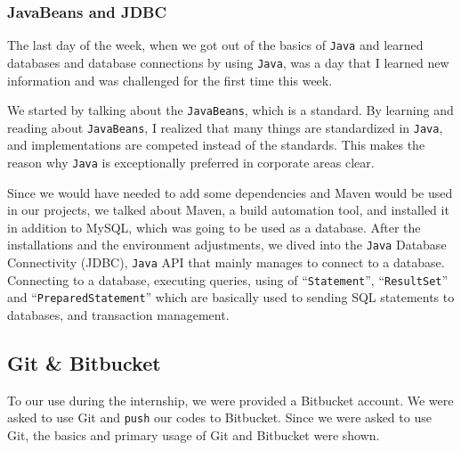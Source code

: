 \subsubsection{JavaBeans and JDBC}

The last day of the week, when we got out of the basics of \texttt{Java} and learned databases and database connections by using \texttt{Java}, was a day that I learned new information and was challenged for the first time this week.

We started by talking about the \texttt{JavaBeans}, which is a standard. By learning and reading about \texttt{JavaBeans}, I realized that many things are standardized in \texttt{Java}, and implementations are competed instead of the standards. This makes the reason why \texttt{Java} is exceptionally preferred in corporate areas clear.

Since we would have needed to add some dependencies and Maven would be used in our projects, we talked about Maven, a build automation tool, and installed it in addition to MySQL, which was going to be used as a database. After the installations and the environment adjustments, we dived into the \texttt{Java} Database Connectivity (JDBC), \texttt{Java} API that mainly manages to connect to a database. Connecting to a database, executing queries, using of ``\texttt{Statement}'', ``\texttt{ResultSet}'' and ``\texttt{PreparedStatement}'' which are basically used to sending SQL statements to databases, and transaction management.


\subsection{Git \& Bitbucket}

To our use during the internship, we were provided a Bitbucket account. We were asked to use Git and \texttt{push} our codes to Bitbucket. Since we were asked to use Git, the basics and primary usage of Git and Bitbucket were shown. 
